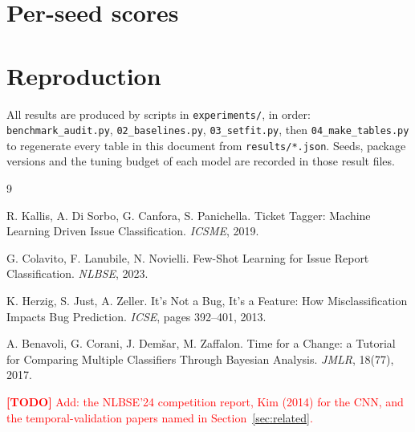 \documentclass[10pt,a4paper]{article}
\newcommand{\todoitem}[1]{\textcolor{red}{\textbf{[TODO]} #1}}
\begin{document}
\appendix
\section{Per-seed scores}
\label{sec:appendix-seeds}



\section{Reproduction}
\label{sec:appendix-repro}

All results are produced by scripts in \texttt{experiments/}, in order:
\texttt{benchmark\_audit.py}, \texttt{02\_baselines.py},
\texttt{03\_setfit.py}, then \texttt{04\_make\_tables.py} to regenerate every
table in this document from \texttt{results/*.json}. Seeds, package versions
and the tuning budget of each model are recorded in those result files.

\begin{thebibliography}{9}

R. Kallis, A. Di Sorbo, G. Canfora, S. Panichella.
\newblock Ticket Tagger: Machine Learning Driven Issue Classification.
\newblock \emph{ICSME}, 2019.

G. Colavito, F. Lanubile, N. Novielli.
\newblock Few-Shot Learning for Issue Report Classification.
\newblock \emph{NLBSE}, 2023.

K. Herzig, S. Just, A. Zeller.
\newblock It's Not a Bug, It's a Feature: How Misclassification Impacts Bug
  Prediction.
\newblock \emph{ICSE}, pages 392--401, 2013.

A. Benavoli, G. Corani, J. Dem\v{s}ar, M. Zaffalon.
\newblock Time for a Change: a Tutorial for Comparing Multiple Classifiers
  Through Bayesian Analysis.
\newblock \emph{JMLR}, 18(77), 2017.

\todoitem{Add: the NLBSE'24 competition report, Kim (2014) for the CNN, and
the temporal-validation papers named in Section~\ref{sec:related}.}

\end{thebibliography}
\end{document}
